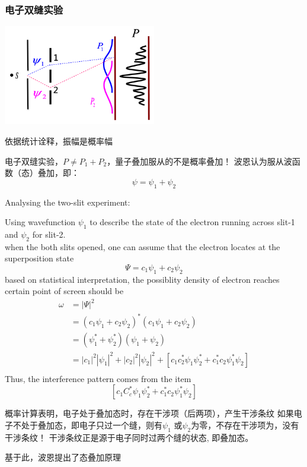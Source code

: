 \begin{frame}
    \frametitle{电子双缝实验}
    \begin{center}
        \includegraphics[width=0.5\textwidth]{figs/sup-3.png} \\
    \end{center} 
    依据统计诠释，振幅是概率幅\\
    \begin{itemize}
        \Item 电子双缝实验，$P\neq P_1+P_2 $，量子叠加服从的不是概率叠加！
        \Item 波恩认为服从波函数（态）叠加，即：
        $$ \psi =\psi_1+\psi_2$$
    \end{itemize}
\end{frame} 


\begin{frame} [allowframebreaks=]
    Analysing the two-slit experiment:\\
    \begin{itemize}
        \Item Using wavefunction $\psi_1$ to describe the state of the electron running across slit-1 and $\psi_2$ for slit-2. \\
        \Item when the both slits opened, one can assume that the electron locates at the superposition state
            \[ \Psi=c_1 \psi_1+ c_2\psi_2 \]
        \Item based on statistical interpretation, the possiblity density of electron reaches certain point of screen should be
        \begin{equation*}
        \begin{split}
            \omega &=|\Psi|^2 \\
            &= (c_1 \psi_1+ c_2\psi_2)^* (c_1 \psi_1+ c_2\psi_2) \\
            &=(\psi_1^*+\psi_2^*)(\psi_1+\psi_2) \\ 
            & = |c_1|^2 |\psi_1|^2 + |c_2|^2 |\psi_2|^2  + [c_1 c_2 ^* \psi_1 \psi_2 ^* + c_1 ^* c_2 \psi_1 ^* \psi_2] \\
        \end{split} 
        \end{equation*}
        \Item Thus, the interference pattern comes from the item  
        \[[c_1 C_c ^* \psi_1 \psi_2 ^* + c_1 ^* c_2 \psi_1 ^* \psi_2] \]
    \end{itemize}
    \begin{itemize}
        \Item 概率计算表明，电子处于叠加态时，存在干涉项（后两项），产生干涉条纹
        \Item 如果电子不处于叠加态，即电子只过一个缝，则有$\psi_1$ 或$\psi_2$为零，不存在干涉项为，没有干涉条纹！
        \Item 干涉条纹正是源于电子同时过两个缝的状态, 即叠加态。
    \end{itemize}
    基于此，波恩提出了态叠加原理
\end{frame}

